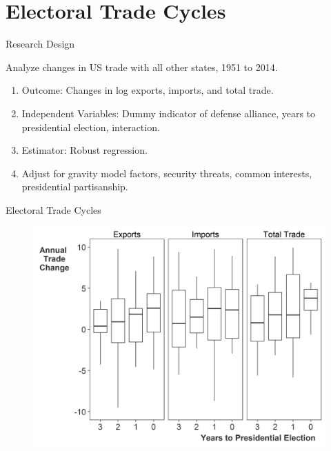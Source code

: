 \documentclass[12pt]{beamer}
\begin{document}


\section{Electoral Trade Cycles} 


\begin{frame}{Research Design}

\pause
Analyze changes in US trade with all other states, 1951 to 2014. 
\pause
\begin{enumerate}
\item Outcome: Changes in log exports, imports, and total trade.
\pause
\item Independent Variables: Dummy indicator of defense alliance, years to presidential election, interaction. 
\pause 
\item Estimator: Robust regression. 
\pause 
\item Adjust for gravity model factors, security threats, common interests, presidential partisanship.
\end{enumerate} 

\end{frame} 


\begin{frame}{Electoral Trade Cycles}

\begin{figure}[htbp]
	\centering
		\includegraphics[height=.9\textheight]{us-trade-cycles.png}
\end{figure}


\end{frame} 
\end{document}
